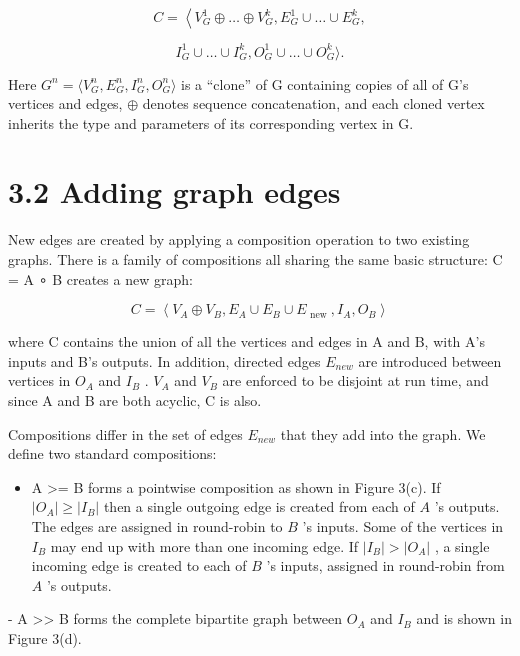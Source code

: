 \documentclass[
]{article}
\providecommand{\tightlist}{%
  \setlength{\itemsep}{0pt}\setlength{\parskip}{0pt}}
\begin{document}
\[
C = \left\langle V _ {G} ^ {1} \oplus \dots \oplus V _ {G} ^ {k}, E _ {G} ^ {1} \cup \dots \cup E _ {G} ^ {k}, \right.
\]

\[
I _ {G} ^ {1} \cup \dots \cup I _ {G} ^ {k}, O _ {G} ^ {1} \cup \dots \cup O _ {G} ^ {k} \rangle .
\]

Here
\(G^{n} = \langle V_{G}^{n}, E_{G}^{n}, I_{G}^{n}, O_{G}^{n} \rangle\)
is a ``clone'' of G containing copies of all of G's vertices and edges,
\(\oplus\) denotes sequence concatenation, and each cloned vertex
inherits the type and parameters of its corresponding vertex in G.

\section{3.2 Adding graph edges}\label{adding-graph-edges}

New edges are created by applying a composition operation to two
existing graphs. There is a family of compositions all sharing the same
basic structure: C = A ∘ B creates a new graph:

\[
C = \left\langle V _ {A} \oplus V _ {B}, E _ {A} \cup E _ {B} \cup E _ {\text { new }}, I _ {A}, O _ {B} \right\rangle
\]

where C contains the union of all the vertices and edges in A and B,
with A's inputs and B's outputs. In addition, directed edges \(E_{new}\)
are introduced between vertices in \(O_{A}\) and \(I_{B}\) . \(V_{A}\)
and \(V_{B}\) are enforced to be disjoint at run time, and since A and B
are both acyclic, C is also.

Compositions differ in the set of edges \(E_{new}\) that they add into
the graph. We define two standard compositions:

\begin{itemize}
\tightlist
\item
  A \textgreater= B forms a pointwise composition as shown in Figure
  3(c). If \(|O_A| \geq |I_B|\) then a single outgoing edge is created
  from each of \(A\) 's outputs. The edges are assigned in round-robin
  to \(B\) 's inputs. Some of the vertices in \(I_B\) may end up with
  more than one incoming edge. If \(|I_B| > |O_A|\) , a single incoming
  edge is created to each of \(B\) 's inputs, assigned in round-robin
  from \(A\) 's outputs.
\end{itemize}

- A \textgreater\textgreater{} B forms the complete bipartite graph
between \(O_A\) and \(I_B\) and is shown in Figure 3(d).
\end{document}
